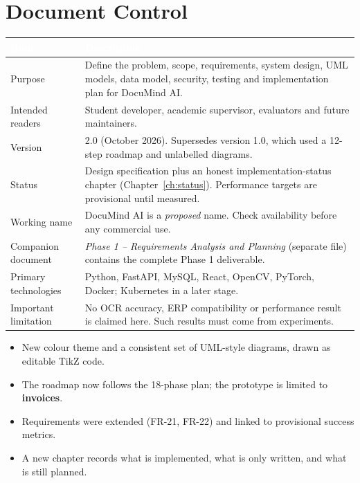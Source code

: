 \documentclass[11pt,a4paper]{report}
\newcommand{\projname}{DocuMind AI}
\newcommand{\docversion}{2.0}
\newcommand{\docdate}{October 2026}
\newcommand{\hdr}[1]{\textcolor{white}{\sffamily\bfseries #1}}
\newcommand{\tblstart}{\rowcolors{2}{white}{rowgray}\arrayrulecolor{teal!60}}
\newcommand{\hdrrow}{\rowcolor{navy}}
\begin{document}
\chapter*{Document Control}
\tblstart\small
\begin{longtable}{L{3.4cm}L{11.0cm}}
\hdrrow \hdr{Item} & \hdr{Description}\\ \endhead
Purpose & Define the problem, scope, requirements, system design, UML models, data model, security, testing and implementation plan for \projname.\\
Intended readers & Student developer, academic supervisor, evaluators and future maintainers.\\
Version & \docversion{} (\docdate). Supersedes version 1.0, which used a 12-step roadmap and unlabelled diagrams.\\
Status & Design specification plus an honest implementation-status chapter (Chapter~\ref{ch:status}). Performance targets are provisional until measured.\\
Working name & \projname{} is a \emph{proposed} name. Check availability before any commercial use.\\
Companion document & \emph{Phase 1 -- Requirements Analysis and Planning} (separate file) contains the complete Phase 1 deliverable.\\
Primary technologies & Python, FastAPI, MySQL, React, OpenCV, PyTorch, Docker; Kubernetes in a later stage.\\
Important limitation & No OCR accuracy, ERP compatibility or performance result is claimed here. Such results must come from experiments.\\
\hline
\end{longtable}

\begin{statusbox}
\begin{itemize}
\item New colour theme and a consistent set of UML-style diagrams, drawn as editable TikZ code.
\item The roadmap now follows the 18-phase plan; the prototype is limited to \textbf{invoices}.
\item Requirements were extended (FR-21, FR-22) and linked to provisional success metrics.
\item A new chapter records what is implemented, what is only written, and what is still planned.
\end{itemize}
\end{statusbox}
\clearpage
\end{document}
